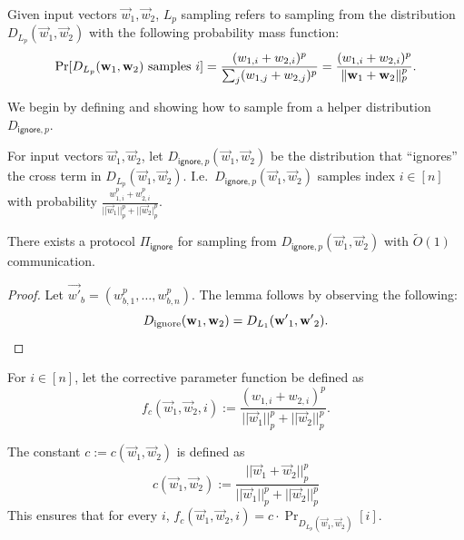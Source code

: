 Given input vectors $\vec{w}_1, \vec{w}_2$,
$L_p$ sampling refers to sampling from the distribution
$D_{L_p}(\vec{w}_1, \vec{w}_2)$ with the following
probability mass function:
$$\Pr[ D_{L_p}(\mathbf{w}_1, \mathbf{w}_2) \mbox{ samples } i ] 
= \frac{(w_{1,i} + w_{2,i})^p}{ \sum_j (w_{1,j} + w_{2,j})^p }
= \frac{(w_{1,i} + w_{2,i})^p}{ \| \mathbf{w}_1 + \mathbf{w}_2 \|_p^p }. $$

We begin by defining and showing how to sample from a helper
distribution $D_{\mathsf{ignore}, p}$.

\begin{definition}
For input vectors $\vec{w}_1, \vec{w}_2$,
let $D_{\mathsf{ignore}, p}(\vec{w}_1, \vec{w}_2)$ be the distribution that ``ignores'' the cross term in $D_{L_p}(\vec{w}_1, \vec{w}_2)$.
I.e.~$D_{\mathsf{ignore}, p}(\vec{w}_1, \vec{w}_2)$
samples index $i \in [n]$
with probability $\frac{w^p_{1,i} + w^p_{2,i}}{||\vec{w}_1||_p^p + ||\vec{w}_2|_p^p}$.
\end{definition}

\begin{lemma}\label{lem:ignore_2}
There exists a protocol $\Pi_{\mathsf{ignore}}$ for sampling from
$D_{\mathsf{ignore}, p}(\vec{w}_1, \vec{w}_2)$ with $\tilde{O}(1)$
communication.
\end{lemma}

\begin{proof}
Let $\vec{w'}_b = (w_{b,1}^p, \ldots, w_{b,n}^p).$
The lemma follows by observing the following:
$$D_{\mathrm{ignore}}(\mathbf{w}_1, \mathbf{w}_2) = D_{L_1}(\mathbf{w'}_1, \mathbf{w'}_2).$$ 
\end{proof}

\begin{definition}
For $i \in [n]$, let the corrective parameter function be defined as 
$$f_c(\vec{w}_1, \vec{w}_2, i) := \frac{(w_{1,i} +
w_{2,i})^p}{||\vec{w}_1||_p^p + ||\vec{w}_2||_p^p}.$$
\end{definition}


\begin{definition} 
The constant 
$c := c(\vec{w}_1, \vec{w}_2)$ 
is defined as
\[
c(\vec{w}_1, \vec{w}_2) := \frac{||\vec{w}_1 + \vec{w}_2||_p^p}{||\vec{w}_1||_p^p + ||\vec{w}_2||_p^p}
\]
This ensures that 
for every $i$,
$f_c(\vec{w}_1, \vec{w}_2, i) = c \cdot \Pr_{D_{L_p}(\vec{w}_1, \vec{w}_2)}[i]$.
\end{definition}

